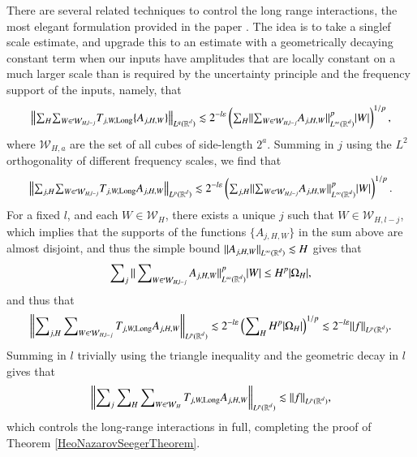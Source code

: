 There are several related techniques to control the long range interactions, the most elegant formulation provided in the paper \cite{HeoandNazarovandSeeger2}. The idea is to take a singlef scale estimate, and upgrade this to an estimate with a geometrically decaying constant term when our inputs have amplitudes that are locally constant on a much larger scale than is required by the uncertainty principle and the frequency support of the inputs, namely, that
%
\begin{equation}
  \left\| {\textstyle \sum\nolimits_H} {\textstyle \sum\nolimits_{W \in \mathcal{W}_{H,l-j}}} T_{j,W,\text{Long}} \{ A_{j,H,W} \} \right\|_{L^q(\operatorname{\mathbb{R}}^d)} \lesssim 2^{-l \varepsilon} \left( {\textstyle \sum\nolimits_H} \| {\textstyle \sum\nolimits_{W \in \mathcal{W}_{H,l-j}}} A_{j,H,W} \|_{L^\infty(\operatorname{\mathbb{R}}^d)}^p |W| \right)^{1/p},
\end{equation}
%
where $\mathcal{W}_{H,a}$ are the set of all cubes of side-length $2^a$. Summing in $j$ using the $L^2$ orthogonality of different frequency scales, we find that
%
\begin{equation}
  \left\| {\textstyle \sum\nolimits_{j,H}} {\textstyle \sum\nolimits_{W \in \mathcal{W}_{H,l-j}}} T_{j,W,\text{Long}} A_{j,H,W} \right\|_{L^p(\operatorname{\mathbb{R}}^d)} \lesssim 2^{-l \varepsilon} \left( {\textstyle \sum\nolimits_{j,H}} \|  {\textstyle \sum\nolimits_{W \in \mathcal{W}_{H,l-j}}} A_{j,H,W} \|_{L^\infty(\operatorname{\mathbb{R}}^d)}^p |W| \right)^{1/p}.
\end{equation}
%
For a fixed $l$, and each $W \in \mathcal{W}_H$, there exists a unique $j$ such that $W \in \mathcal{W}_{H,l-j}$, which implies that the supports of the functions $\{ A_{j,H,W} \}$ in the sum above are almost disjoint, and thus the simple bound $\| A_{j,H,W} \|_{L^\infty(\operatorname{\mathbb{R}}^d)} \lesssim H$ gives that
%
\begin{equation}
  \sum\nolimits_j \| \sum\nolimits_{W \in \mathcal{W}_{H,l-j}} A_{j,H,W} \|_{L^\infty(\operatorname{\mathbb{R}}^d)}^p |W| \leq H^p |\Omega_H|,
\end{equation}
%
and thus that
%
\begin{equation}
  \left\| \sum\nolimits_{j,H} \sum\nolimits_{W \in \mathcal{W}_{H,l-j}} T_{j,W,\text{Long}} A_{j,H,W} \right\|_{L^p(\operatorname{\mathbb{R}}^d)} \lesssim 2^{-l \varepsilon} \left( \sum\nolimits_H H^p |\Omega_H| \right)^{1/p} \lesssim 2^{-l\varepsilon} \| f \|_{L^p(\operatorname{\mathbb{R}}^d)}.
\end{equation}
%
Summing in $l$ trivially using the triangle inequality and the geometric decay in $l$ gives that
%
\begin{equation}
  \left\| \sum\nolimits_j \sum\nolimits_H \sum\nolimits_{W \in \mathcal{W}_{H}} T_{j,W,\text{Long}} A_{j,H,W} \right\|_{L^p(\operatorname{\mathbb{R}}^d)} \lesssim \| f \|_{L^p(\operatorname{\mathbb{R}}^d)},
\end{equation}
%
which controls the long-range interactions in full, completing the proof of Theorem \ref{HeoNazarovSeegerTheorem}.

